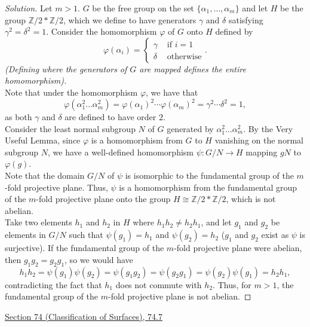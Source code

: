 \documentclass[11pt]{article}
\newcommand{\Z}{\mathbb{Z}}
\newenvironment{solution}
  {\renewcommand\qedsymbol{$\blacksquare$}\begin{proof}[Solution]}
  {\end{proof}}
\begin{document}
\begin{solution}
Let $m > 1$. $G$ be the free group on the set $\{ \alpha_1, \dots, \alpha_m \}$ and let $H$ be the group $\Z / 2 * \Z / 2$, which we define
to have generators $\gamma$ and $\delta$ satisfying $\gamma^2 = \delta^2 = 1$.
Consider the homomorphism $\varphi$ of $G$ onto $H$ defined by
\[
    \varphi(\alpha_i) = \begin{cases}
        \gamma &\text{ if $i = 1$}  \\
        \delta &\text{ otherwise}
    \end{cases}.
\]
\textit{(Defining where the generators of $G$ are mapped defines the entire homomorphism).}\\

 Note that under the homomorphism $\varphi$, we have that
\[
    \varphi(\alpha_1^2 \dots \alpha_m^2) = \varphi(\alpha_1)^2 \cdots \varphi(\alpha_m)^2 = \gamma^2 \cdots \delta^2 = 1,
\]
as both $\gamma$ and $\delta$ are defined to have order $2$. \\

Consider the least normal subgroup $N$ of $G$ generated by $\alpha_1^2 \dots \alpha_m^2$. 
By the Very Useful Lemma, since $\varphi$ is a homomorphism from $G$ to $H$ vanishing on the normal subgroup $N$, we have a well-defined homomorphism $\psi\colon G / N \rightarrow H$ mapping $gN$ to $\varphi(g)$. \\

Note that the domain $G/N$ of $\psi$ is isomorphic to the fundamental group of the $m$-fold projective plane. Thus, $\psi$ is a homomorphism
from the fundamental group of the $m$-fold projective plane onto the group $H \cong \Z / 2 * \Z / 2$, which is not abelian. \\

Take two elements $h_1$ and $h_2$ in $H$ where $h_1h_2 \neq h_2h_1$, and let $g_1$ and $g_2$ be elements in $G/N$ such that $\psi(g_1) = h_1$ and $\psi(g_2) = h_2$ ($g_1$ and $g_2$ exist as $\psi$ is surjective). 
If the fundamental group of the $m$-fold projective plane were abelian, then $g_1g_2 = g_2g_1$, so we would have
\[
    h_1 h_2 = \psi(g_1)\psi(g_2) = \psi(g_1g_2) = \psi(g_2g_1) = \psi(g_2)\psi(g_1) = h_2 h_1,
\]
contradicting the fact that $h_1$ does not commute with $h_2$. Thus, for $m > 1$, the fundamental group of the $m$-fold projective plane is not abelian.
\end{solution}

\newpage

\underline{Section 74 (Classification of Surfaces), 74.7} \\
\end{document}
